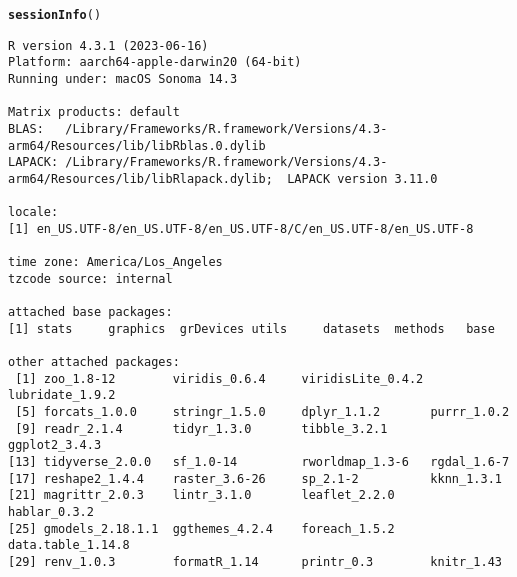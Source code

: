 \documentclass{article}\usepackage[]{graphicx}\usepackage[]{xcolor}
\makeatletter
\newcommand{\hlstd}[1]{\textcolor[rgb]{0.345,0.345,0.345}{#1}}%
\newcommand{\hlkwd}[1]{\textcolor[rgb]{0.737,0.353,0.396}{\textbf{#1}}}%
\newenvironment{kframe}{%
 \def\at@end@of@kframe{}%
 \ifinner\ifhmode%
  \def\at@end@of@kframe{\end{minipage}}%
  \begin{minipage}{\columnwidth}%
 \fi\fi%
 \def\FrameCommand##1{\hskip\@totalleftmargin \hskip-\fboxsep
 \colorbox{shadecolor}{##1}\hskip-\fboxsep
     \hskip-\linewidth \hskip-\@totalleftmargin \hskip\columnwidth}%
 \MakeFramed {\advance\hsize-\width
   \@totalleftmargin\z@ \linewidth\hsize
   \@setminipage}}%
 {\par\unskip\endMakeFramed%
 \at@end@of@kframe}
\newenvironment{knitrout}{}{} %
\makeatother
\begin{document}
\begin{knitrout}\footnotesize
{}\color{fgcolor}\begin{kframe}
\begin{alltt}
\hlkwd{sessionInfo}\hlstd{()}
\end{alltt}
\begin{verbatim}
R version 4.3.1 (2023-06-16)
Platform: aarch64-apple-darwin20 (64-bit)
Running under: macOS Sonoma 14.3

Matrix products: default
BLAS:   /Library/Frameworks/R.framework/Versions/4.3-arm64/Resources/lib/libRblas.0.dylib 
LAPACK: /Library/Frameworks/R.framework/Versions/4.3-arm64/Resources/lib/libRlapack.dylib;  LAPACK version 3.11.0

locale:
[1] en_US.UTF-8/en_US.UTF-8/en_US.UTF-8/C/en_US.UTF-8/en_US.UTF-8

time zone: America/Los_Angeles
tzcode source: internal

attached base packages:
[1] stats     graphics  grDevices utils     datasets  methods   base     

other attached packages:
 [1] zoo_1.8-12        viridis_0.6.4     viridisLite_0.4.2 lubridate_1.9.2  
 [5] forcats_1.0.0     stringr_1.5.0     dplyr_1.1.2       purrr_1.0.2      
 [9] readr_2.1.4       tidyr_1.3.0       tibble_3.2.1      ggplot2_3.4.3    
[13] tidyverse_2.0.0   sf_1.0-14         rworldmap_1.3-6   rgdal_1.6-7      
[17] reshape2_1.4.4    raster_3.6-26     sp_2.1-2          kknn_1.3.1       
[21] magrittr_2.0.3    lintr_3.1.0       leaflet_2.2.0     hablar_0.3.2     
[25] gmodels_2.18.1.1  ggthemes_4.2.4    foreach_1.5.2     data.table_1.14.8
[29] renv_1.0.3        formatR_1.14      printr_0.3        knitr_1.43       


\end{verbatim}
\end{kframe}
\end{knitrout}
\end{document}
